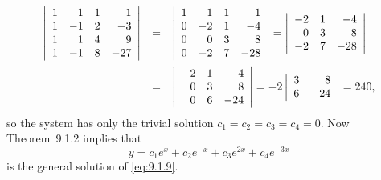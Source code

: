\begin{examplesolution}
\begin{equation}
\begin{array}{rcl}
    \left|\begin{array}{rrrr}1&1&1&1\\1&-1&2&-3\\1&1&4&9\\ 1&-1&8&-27\end{array}\right| & = & \left|\begin{array}{rrrr}1&1&1&1\\0&-2&1&-4\\0&0&3&8\\ 0&-2&7&-28\end{array}\right| =\left|\begin{array}{rrr}-2&1&-4\\0&3&8\\ -2&7&-28\end{array}\right| \\[8\jot]
                                                                                        & = & \left|\begin{array}{rrr}-2&1&-4\\0&3&8 \\0&6&-24\end{array}\right|= -2\left|\begin{array}{rr}3&8\\6&-24\end{array}\right|=240,
  \end{array}
\end{equation}
so the system has only the trivial solution $c_{1}=c_{2}=c_{3}=c_{4}=0$. Now
Theorem~9.1.2 implies that
\[
  y=c_{1}e^{x}+c_{2}e^{-x}+c_{3}e^{2x}+c_{4}e^{-3x}
\]
is the general solution of \eqref{eq:9.1.9}.
\end{examplesolution}

